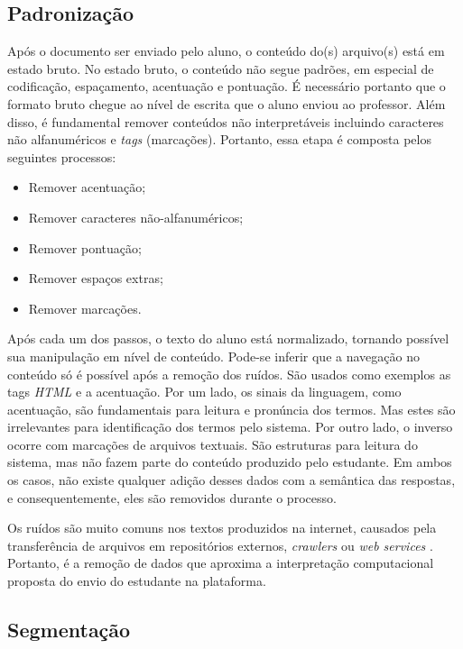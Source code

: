 \subsection{Padronização}
\label{subsec-padronizacao}


Após o documento ser enviado pelo aluno, o conteúdo do(s) arquivo(s) está em estado bruto. No estado bruto, o conteúdo não segue padrões, em especial de codificação, espaçamento, acentuação e pontuação. É necessário portanto que o formato bruto chegue ao nível de escrita que o aluno enviou ao professor. Além disso, é fundamental remover conteúdos não interpretáveis incluindo caracteres não alfanuméricos e \textit{tags} (marcações). Portanto, essa etapa é composta pelos seguintes processos:

\begin{itemize}
	\item Remover acentuação;
	\item Remover caracteres não-alfanuméricos;
	\item Remover pontuação;
	\item Remover espaços extras;
	\item Remover marcações.
\end{itemize}

Após cada um dos passos, o texto do aluno está normalizado, tornando possível sua manipulação em nível de conteúdo. Pode-se inferir que a navegação no conteúdo só é possível após a remoção dos ruídos. São usados como exemplos as tags \textit{HTML} e a acentuação. Por um lado, os sinais da linguagem, como acentuação, são fundamentais para leitura e pronúncia dos termos. Mas estes são irrelevantes para identificação dos termos pelo sistema. Por outro lado, o inverso ocorre com marcações de arquivos textuais. São estruturas para leitura do sistema, mas não fazem parte do conteúdo produzido pelo estudante. Em ambos os casos, não existe qualquer adição desses dados com a semântica das respostas, e consequentemente, eles são removidos durante o processo. 

Os ruídos são muito comuns nos textos produzidos na internet, causados pela transferência de arquivos em repositórios externos, \textit{crawlers} ou \textit{web services} \cite{han2011}. Portanto, é a remoção de dados que aproxima a interpretação computacional proposta do envio do estudante na plataforma.

\subsection{Segmentação}
\label{subsec-segmentacao}

